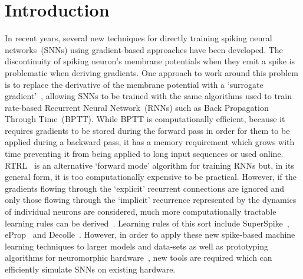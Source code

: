 \documentclass[sigconf]{acmart}
\begin{document}


\maketitle

\section{Introduction}
In recent years, several new techniques for directly training spiking neural networks~(SNNs) using gradient-based approaches have been developed.
The discontinuity of spiking neuron's membrane potentials when they emit a spike is problematic when deriving gradients.
One approach to work around this problem is to replace the derivative of the membrane potential with a `surrogate gradient'~\citep{Bohte2011,Bellec2018,Zenke2021a}, allowing SNNs to be trained with the same algorithms used to train rate-based Recurrent Neural Network~(RNNs) such as Back Propagation Through Time~(BPTT).
While BPTT is computationally efficient, because it requires gradients to be stored during the forward pass in order for them to be applied during a backward pass, it has a memory requirement which grows with time preventing it from being applied to long input sequences or used online.
RTRL~\citep{Williams1989} is an alternative `forward mode' algorithm for training RNNs but, in its general form, it is too computationally expensive to be practical.
However, if the gradients flowing through the `explicit' recurrent connections are ignored and only those flowing through the `implicit' recurrence represented by the dynamics of individual neurons are considered, much more computationally tractable learning rules can be derived~\citep{Zenke2021}.
Learning rules of this sort include SuperSpike~\citep{Zenke2018}, eProp~\citep{Bellec2020} and Decolle~\citep{Kaiser2020}.
However, in order to apply these new spike-based machine learning techniques to larger models and data-sets as well as prototyping algorithms for neuromorphic hardware~\citep{Davies2018,Furber2014,Merolla2014}, new tools are required which can efficiently simulate SNNs on existing hardware. 
\end{document}
